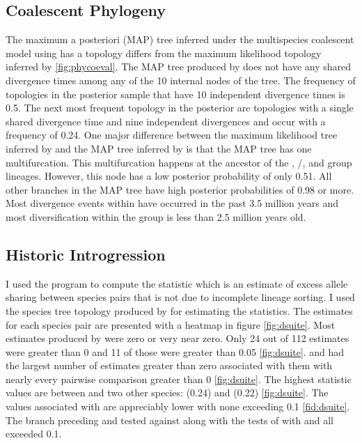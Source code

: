\subsection{Coalescent Phylogeny}
The maximum a posteriori (MAP) tree inferred under the multispecies coalescent
model using \phycoeval has a topology differs from the maximum likelihood topology 
inferred by \iqtree \cref{fig:phycoeval}.
The MAP tree produced by \phycoeval does not have any shared divergence times 
among any  of the 10 internal nodes of the tree.
The frequency of topologies in the posterior sample that have 10 independent 
divergence times is 0.5.
The next most frequent topology in the posterior are topologies with a single 
shared divergence time and nine independent divergences and occur with a frequency
of 0.24.
One major difference between the maximum likelihood tree inferred by \iqtree and 
the MAP tree inferred by \phycoeval is that the MAP tree has one multifurcation. 
This multifurcation happens at the ancestor of the \quercicus, \speciosus/\cognatus,
and \amer group lineages.
However, this node has a low posterior probability of only 0.51. 
All other branches in the MAP tree have high posterior probabilities of 0.98 or more. 
Most divergence events within \anaxyrus have occurred in the past 3.5 million 
years and most diversification within the \amer group is less than 2.5   
million years old.

\subsection{Historic Introgression}
I used the program \dsuite to compute the \fbranch statistic which is an  
estimate of excess allele sharing between species pairs that is not due to 
incomplete lineage sorting. 
I used the species tree topology produced by \phycoeval for estimating 
the \fbranch statistics. 
The \fbranch estimates for each species pair are presented with a heatmap in 
figure \ref{fig:dsuite}.
Most \fbranch estimates produced by \dsuite were zero or very near zero.
Only 24 out of 112 \fbranch estimates were greater than 0 and 11 of those were 
greater than 0.05 \cref{fig:dsuite}.
\amer and \wood had the largest number of estimates greater than
zero associated with them with nearly every pairwise comparison greater than 0
\cref{fig:dsuite}. 
The highest \fbranch statistic values are between \amer and two other 
species: \hemiophrys (0.24) and \baxteri (0.22) \cref{fig:dsuite}.
The values associated with \wood are appreciably lower with none exceeding 
0.1 \cref{fid:dsuite}.
The branch preceding \speciosus and \cognatus tested against \punctatus
along with the tests of \quercicus with \cognatus and \speciosus all exceeded  
0.1.

